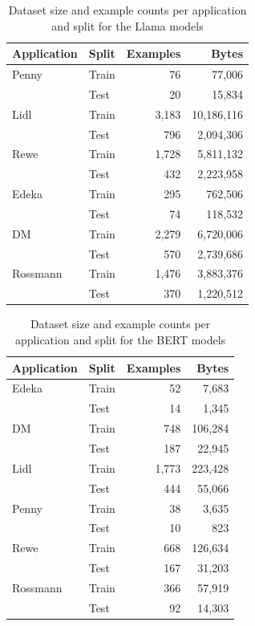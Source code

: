 \documentclass[licencjacka,en]{pracamgr}
\begin{document}
\begin{table}[h!]
\centering
\begin{tabular}{|l|l|r|r|}
\hline
\textbf{Application} & \textbf{Split} & \textbf{Examples} & \textbf{Bytes} \\
\hline
Penny     & Train & 76  & 77,006 \\
          & Test  & 20  & 15,834 \\
Lidl      & Train & 3,183 & 10,186,116 \\
          & Test  & 796  & 2,094,306 \\
Rewe      & Train & 1,728 & 5,811,132 \\
          & Test  & 432  & 2,223,958 \\
Edeka     & Train & 295  & 762,506 \\
          & Test  & 74   & 118,532 \\
DM        & Train & 2,279 & 6,720,006 \\
          & Test  & 570  & 2,739,686 \\
Rossmann  & Train & 1,476 & 3,883,376 \\
          & Test  & 370  & 1,220,512 \\
\hline
\end{tabular}
\caption{Dataset size and example counts per application and split for the Llama models}
\end{table}

\begin{table}[h!]
\centering
\begin{tabular}{|l|l|r|r|}
\hline
\textbf{Application} & \textbf{Split} & \textbf{Examples} & \textbf{Bytes} \\
\hline
Edeka     & Train & 52  & 7,683 \\
          & Test  & 14  & 1,345 \\
DM        & Train & 748 & 106,284 \\
          & Test  & 187 & 22,945 \\
Lidl      & Train & 1,773 & 223,428 \\
          & Test  & 444  & 55,066 \\
Penny     & Train & 38  & 3,635 \\
          & Test  & 10  & 823 \\
Rewe      & Train & 668 & 126,634 \\
          & Test  & 167 & 31,203 \\
Rossmann  & Train & 366 & 57,919 \\
          & Test  & 92  & 14,303 \\
\hline
\end{tabular}
\caption{Dataset size and example counts per application and split for the BERT models}
\end{table}
\end{document}
